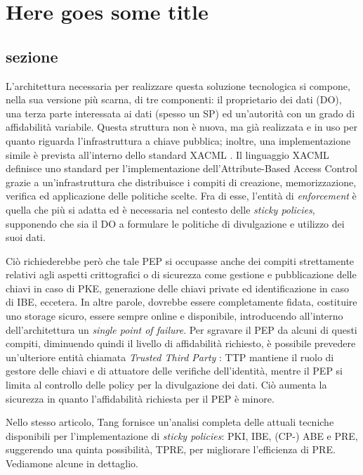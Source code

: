 \chapter{Here goes some title}
\label{capitolo2}
\thispagestyle{empty}

\section{sezione} 


L’architettura necessaria per realizzare questa soluzione tecnologica si compone, nella sua versione più scarna, di tre componenti: il proprietario dei dati (DO), una terza parte interessata ai dati (spesso un SP) ed un’autorit\`a con un grado di affidabilit\`a variabile. Questa struttura non è nuova, ma gi\`a realizzata e in uso per quanto riguarda l’infrastruttura a chiave pubblica; inoltre, una implementazione simile \`e prevista all’interno dello standard XACML \cite{standard2005extensible}. Il linguaggio XACML definisce uno standard per l’implementazione dell’Attribute-Based Access Control grazie a un'infrastruttura che distribuisce i compiti di creazione, memorizzazione, verifica ed applicazione delle politiche scelte. Fra di esse, l’entit\`a di \textit{enforcement} \`e quella che pi\`u si adatta ed \`e necessaria nel contesto delle \textit{sticky policies}, supponendo che sia il DO a formulare le politiche di divulgazione e utilizzo dei suoi dati. 

Ci\`o richiederebbe per\`o che tale PEP si occupasse anche dei compiti strettamente relativi agli aspetti crittografici o di sicurezza come gestione e pubblicazione delle chiavi in caso di PKE, generazione delle chiavi private ed identificazione in caso di IBE, eccetera. In altre parole, dovrebbe essere completamente fidata, costituire uno storage sicuro, essere sempre online e disponibile, introducendo all’interno dell’architettura un \textit{single point of failure}. Per sgravare il PEP da alcuni di questi compiti, diminuendo quindi il livello di affidabilità richiesto, è possibile prevedere un'ulteriore entit\`a chiamata \textit{Trusted Third Party} \cite{tang2008using}: TTP mantiene il ruolo di gestore delle chiavi e di attuatore delle verifiche dell’identit\`a, mentre il PEP si limita al controllo delle policy per la divulgazione dei dati. Ci\`o aumenta la sicurezza in quanto l’affidabilit\`a richiesta per il PEP \`e minore.

Nello stesso articolo, Tang fornisce un’analisi completa delle attuali tecniche disponibili per l’implementazione di \textit{sticky policies}: PKI, IBE, (CP-) ABE e PRE, suggerendo una quinta possibilit\`a, TPRE, per migliorare l’efficienza di PRE. Vediamone alcune in dettaglio.

